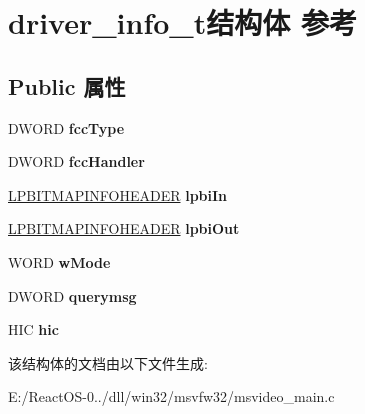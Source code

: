 \hypertarget{structdriver__info__t}{}\section{driver\+\_\+info\+\_\+t结构体 参考}
\label{structdriver__info__t}
\subsection*{Public 属性}
\begin{DoxyCompactItemize}
\item 
\mbox{\label{structdriver__info__t_a33f03d56e534ec55fd2637c22572f6af}} 
D\+W\+O\+RD {\bfseries fcc\+Type}
\item 
\mbox{\label{structdriver__info__t_a1fe5d618b54df5af888db27f9124c929}} 
D\+W\+O\+RD {\bfseries fcc\+Handler}
\item 
\mbox{\label{structdriver__info__t_a5c665500050f9f282d3b34cf3d78b38f}} 
\hyperlink{struct_b_i_t_m_a_p_i_n_f_o_h_e_a_d_e_r}{L\+P\+B\+I\+T\+M\+A\+P\+I\+N\+F\+O\+H\+E\+A\+D\+ER} {\bfseries lpbi\+In}
\item 
\mbox{\label{structdriver__info__t_aa1549573fd8bcf355828208aae2976bb}} 
\hyperlink{struct_b_i_t_m_a_p_i_n_f_o_h_e_a_d_e_r}{L\+P\+B\+I\+T\+M\+A\+P\+I\+N\+F\+O\+H\+E\+A\+D\+ER} {\bfseries lpbi\+Out}
\item 
\mbox{\label{structdriver__info__t_aa96322f27dec3e1b46382829132ff199}} 
W\+O\+RD {\bfseries w\+Mode}
\item 
\mbox{\label{structdriver__info__t_a8eb217d16184426771efd38d5e2dadee}} 
D\+W\+O\+RD {\bfseries querymsg}
\item 
\mbox{\label{structdriver__info__t_a816f99be222d0c1a0283087eb9f963bc}} 
H\+IC {\bfseries hic}
\end{DoxyCompactItemize}


该结构体的文档由以下文件生成\+:\begin{DoxyCompactItemize}
\item 
E\+:/\+React\+O\+S-\/0../dll/win32/msvfw32/msvideo\+\_\+main.\+c\end{DoxyCompactItemize}
